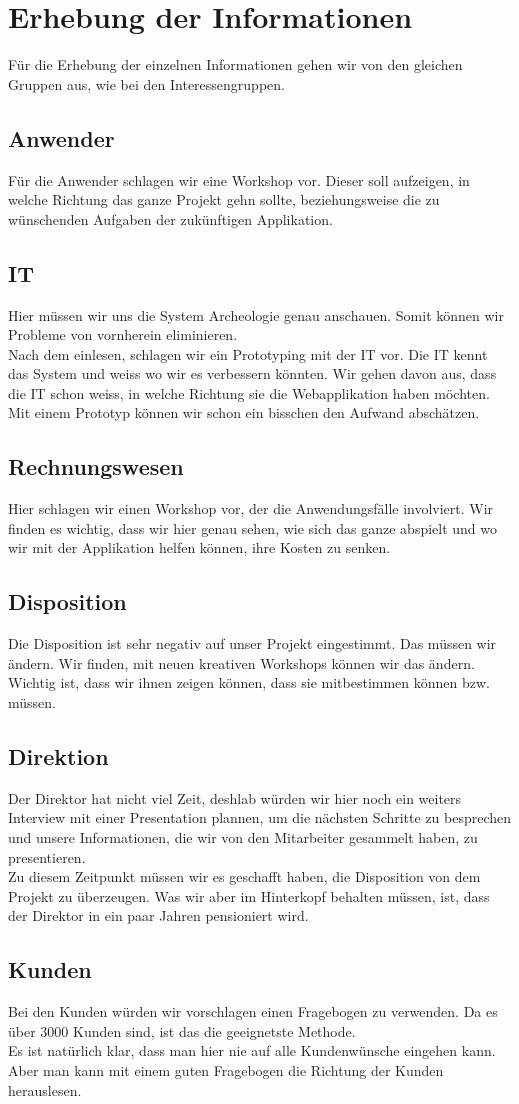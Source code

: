 \section{Erhebung der Informationen}
Für die Erhebung der einzelnen Informationen gehen wir von den gleichen Gruppen aus, wie bei den Interessengruppen.
\subsection{Anwender}
Für die Anwender schlagen wir eine Workshop vor. Dieser soll aufzeigen, in welche Richtung das ganze Projekt gehn sollte, beziehungsweise die zu wünschenden Aufgaben der zukünftigen Applikation.
%
\subsection{IT}
Hier müssen wir uns die System Archeologie genau anschauen. Somit können wir Probleme von vornherein eliminieren.\\
Nach dem einlesen, schlagen wir ein Prototyping mit der IT vor. Die IT kennt das System und weiss wo wir es verbessern könnten. Wir gehen davon aus, dass die IT schon weiss, in welche Richtung sie die Webapplikation haben möchten. Mit einem Prototyp können wir schon ein bisschen den Aufwand abschätzen.
%
\subsection{Rechnungswesen}
Hier schlagen wir einen Workshop vor, der die Anwendungsfälle involviert. Wir finden es wichtig, dass wir hier genau sehen, wie sich das ganze abspielt und wo wir mit der Applikation helfen können, ihre Kosten zu senken.
%
\subsection{Disposition}
Die Disposition ist sehr negativ auf unser Projekt eingestimmt. Das müssen wir ändern. Wir finden, mit neuen kreativen Workshops können wir das ändern. Wichtig ist, dass wir ihnen zeigen können, dass sie mitbestimmen können bzw. müssen. 
%
\subsection{Direktion}
Der Direktor hat nicht viel Zeit, deshlab würden wir hier noch ein weiters Interview mit einer Presentation plannen, um die nächsten Schritte zu besprechen und unsere Informationen, die wir von den Mitarbeiter gesammelt haben, zu presentieren.\\
Zu diesem Zeitpunkt müssen wir es geschafft haben, die Disposition von dem Projekt zu überzeugen. Was wir aber im Hinterkopf behalten müssen, ist, dass der Direktor in ein paar Jahren pensioniert wird.
%
\subsection{Kunden}
Bei den Kunden würden wir vorschlagen einen Fragebogen zu verwenden. Da es über 3000 Kunden sind, ist das die geeignetste Methode.\\
Es ist natürlich klar, dass man hier nie auf alle Kundenwünsche eingehen kann. Aber man kann mit einem guten Fragebogen die Richtung der Kunden herauslesen.